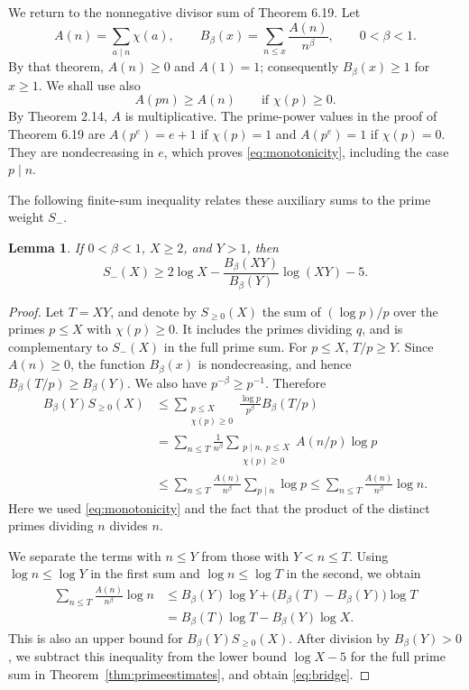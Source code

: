 \documentclass[11pt,twoside,leqno]{article}
\theoremstyle{apostol}
\newtheorem{lemma}[theorem]{Lemma}
\begin{document}
We return to the nonnegative divisor sum of Theorem 6.19. Let
\[
 A(n)=\sum_{a\mid n}\chi(a),\qquad
 B_\beta(x)=\sum_{n\le x}\frac{A(n)}{n^\beta},\qquad 0<\beta<1.
\]
By that theorem, \(A(n)\ge0\) and \(A(1)=1\); consequently
\(B_\beta(x)\ge1\) for \(x\ge1\). We shall use also
\begin{equation}\label{eq:monotonicity}
 A(pn)\ge A(n)\qquad\text{if }\chi(p)\ge0.
\end{equation}
By Theorem 2.14, \(A\) is multiplicative. The prime-power values in the
proof of Theorem 6.19 are \(A(p^e)=e+1\) if
\(\chi(p)=1\) and \(A(p^e)=1\) if \(\chi(p)=0\).
They are nondecreasing in \(e\), which proves
\eqref{eq:monotonicity}, including the case \(p\mid n\).

The following finite-sum inequality relates these auxiliary sums to
the prime weight \(S_-\).

\begin{lemma}\label{lem:bridge}
If \(0<\beta<1\), \(X\ge2\), and \(Y>1\), then
\begin{equation}\label{eq:bridge}
 S_-(X)\ge2\log X
       -\frac{B_\beta(XY)}{B_\beta(Y)}\log(XY)-5.
\end{equation}
\end{lemma}

\begin{proof}
Let \(T=XY\), and denote by \(S_{\ge0}(X)\) the sum
of \((\log p)/p\) over the primes \(p\le X\) with \(\chi(p)\ge0\).
It includes the primes dividing \(q\), and is complementary to
\(S_-(X)\) in the full prime sum. For \(p\le X\),
\(T/p\ge Y\). Since \(A(n)\ge0\), the function \(B_\beta(x)\) is
nondecreasing, and hence \(B_\beta(T/p)\ge B_\beta(Y)\). We also have
\(p^{-\beta}\ge p^{-1}\). Therefore
\begin{align*}
 B_\beta(Y)S_{\ge0}(X)
 &\le\sum_{\substack{p\le X\\\chi(p)\ge0}}
       \frac{\log p}{p^\beta}B_\beta(T/p)\\
 &=\sum_{n\le T}\frac1{n^\beta}
       \sum_{\substack{p\mid n,\ p\le X\\\chi(p)\ge0}}
                    A(n/p)\log p\\
 &\le\sum_{n\le T}\frac{A(n)}{n^\beta}\sum_{p\mid n}\log p
 \le\sum_{n\le T}\frac{A(n)}{n^\beta}\log n.
\end{align*}
Here we used \eqref{eq:monotonicity} and the fact that the product of the
distinct primes dividing \(n\) divides \(n\).

We separate the terms with \(n\le Y\) from those with \(Y<n\le T\).
Using \(\log n\le\log Y\) in the first sum and \(\log n\le\log T\) in the
second, we obtain
\begin{align*}
 \sum_{n\le T}\frac{A(n)}{n^\beta}\log n
 &\le B_\beta(Y)\log Y
   +\bigl(B_\beta(T)-B_\beta(Y)\bigr)\log T\\
 &=B_\beta(T)\log T-B_\beta(Y)\log X.
\end{align*}
This is also an upper bound for \(B_\beta(Y)S_{\ge0}(X)\).
After division by \(B_\beta(Y)>0\), we subtract this inequality from the
lower bound \(\log X-5\) for the full prime sum in
Theorem~\ref{thm:primeestimates}, and obtain \eqref{eq:bridge}.
\end{proof}
\end{document}
